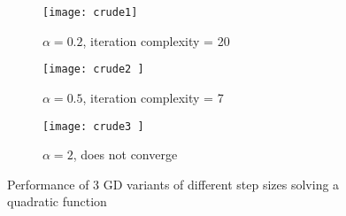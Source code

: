 \begin{figure}[h!]
  \centering
  \begin{subfigure}{.5\textwidth}
    \centering
    \texttt{[image: crude1]}
    \caption{$\alpha = 0.2$, iteration complexity = 20}
    \label{fig:crude1}
  \end{subfigure}%
  \begin{subfigure}{.5\textwidth}
    \centering
    \texttt{[image: crude2 ]}
    \caption{$\alpha = 0.5$, iteration complexity = 7}
    \label{fig:crude2}
  \end{subfigure}
  \begin{subfigure}{.5\textwidth}
    \centering
    \texttt{[image: crude3 ]}
    \caption{$\alpha = 2$, does not converge}
    \label{fig:crude3}
  \end{subfigure}
  \caption{Performance of 3 GD variants of different step sizes solving a quadratic function}
\label{fig:test}
\end{figure}



